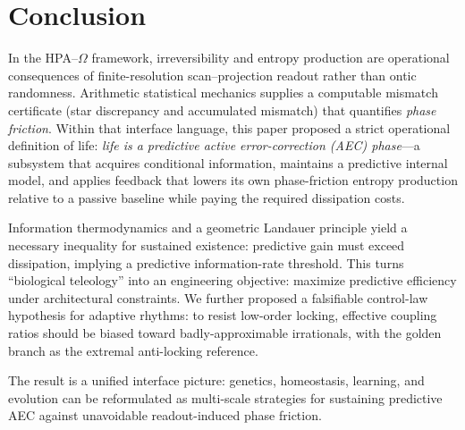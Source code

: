 \section{Conclusion}
\label{sec:conclusion}

In the HPA--$\Omega$ framework, irreversibility and entropy production are operational consequences of finite-resolution scan--projection readout rather than ontic randomness.
Arithmetic statistical mechanics supplies a computable mismatch certificate (star discrepancy and accumulated mismatch) that quantifies \emph{phase friction}.
Within that interface language, this paper proposed a strict operational definition of life:
\emph{life is a predictive active error-correction (AEC) phase}---a subsystem that acquires conditional information, maintains a predictive internal model, and applies feedback that lowers its own phase-friction entropy production relative to a passive baseline while paying the required dissipation costs.

Information thermodynamics and a geometric Landauer principle yield a necessary inequality for sustained existence: predictive gain must exceed dissipation, implying a predictive information-rate threshold.
This turns ``biological teleology'' into an engineering objective: maximize predictive efficiency under architectural constraints.
We further proposed a falsifiable control-law hypothesis for adaptive rhythms: to resist low-order locking, effective coupling ratios should be biased toward badly-approximable irrationals, with the golden branch as the extremal anti-locking reference.

The result is a unified interface picture: genetics, homeostasis, learning, and evolution can be reformulated as multi-scale strategies for sustaining predictive AEC against unavoidable readout-induced phase friction.


